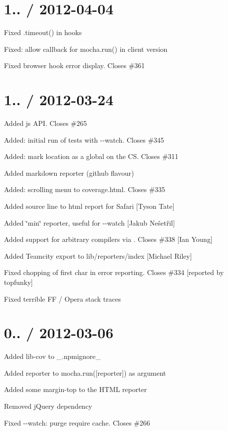 \section*{1.. / 2012-\/04-\/04}


\begin{DoxyItemize}
\item Fixed {\ttfamily .timeout()} in hooks
\item Fixed\+: allow callback for {\ttfamily mocha.\+run()} in client version
\item Fixed browser hook error display. Closes \#361
\end{DoxyItemize}

\section*{1.. / 2012-\/03-\/24}


\begin{DoxyItemize}
\item Added js A\+PI. Closes \#265
\item Added\+: initial run of tests with {\ttfamily -\/-\/watch}. Closes \#345
\item Added\+: mark {\ttfamily location} as a global on the CS. Closes \#311
\item Added {\ttfamily markdown} reporter (github flavour)
\item Added\+: scrolling menu to coverage.\+html. Closes \#335
\item Added source line to html report for Safari \mbox{[}Tyson Tate\mbox{]}
\item Added \char`\"{}min\char`\"{} reporter, useful for {\ttfamily -\/-\/watch} \mbox{[}Jakub Nešetřil\mbox{]}
\item Added support for arbitrary compilers via . Closes \#338 \mbox{[}Ian Young\mbox{]}
\item Added Teamcity export to lib/reporters/index \mbox{[}Michael Riley\mbox{]}
\item Fixed chopping of first char in error reporting. Closes \#334 \mbox{[}reported by topfunky\mbox{]}
\item Fixed terrible FF / Opera stack traces
\end{DoxyItemize}

\section*{0.. / 2012-\/03-\/06}


\begin{DoxyItemize}
\item Added lib-\/cov to \+\_\+.\+npmignore\+\_\+
\item Added reporter to {\ttfamily mocha.\+run(\mbox{[}reporter\mbox{]})} as argument
\item Added some margin-\/top to the H\+T\+ML reporter
\item Removed j\+Query dependency
\item Fixed {\ttfamily -\/-\/watch}\+: purge require cache. Closes \#266
\end{DoxyItemize}

